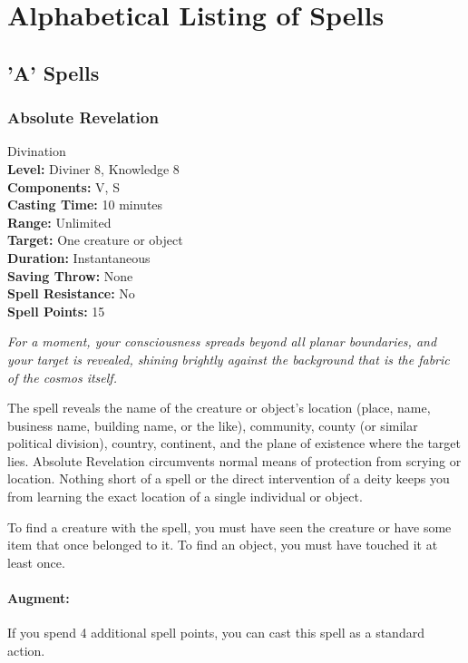 \section{Alphabetical Listing of Spells}
\subsection{'A' Spells}
\subsubsection{Absolute Revelation}
\label{Spell:AbsoluteRevelation}
Divination
\\ \textbf{Level:} Diviner 8, Knowledge 8
\\ \textbf{Components:} V, S
\\ \textbf{Casting Time:} 10 minutes
\\ \textbf{Range:} Unlimited
\\ \textbf{Target:} One creature or object
\\ \textbf{Duration:} Instantaneous
\\ \textbf{Saving Throw:} None
\\ \textbf{Spell Resistance:} No
\\ \textbf{Spell Points:} 15

\emph{For a moment, your consciousness spreads beyond all planar boundaries, and your target is revealed, shining brightly against the background that is the fabric of the cosmos itself.}

The spell reveals the name of the creature or object's location (place, name, business name, building name, or the like), community, county (or similar political division), country, continent, and the plane of existence where the target lies.
Absolute Revelation circumvents normal means of protection from scrying or location. 
Nothing short of a  spell or the direct intervention of a deity keeps you from learning the exact location of a single individual or object.

To find a creature with the spell, you must have seen the creature or have some item that once belonged to it. 
To find an object, you must have touched it at least once.

\paragraph{Augment:} If you spend 4 additional spell points, you can cast this spell as a standard action.
